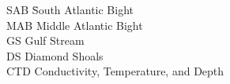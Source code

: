 
%
%
\begingroup
\newcommand{\Ab}[2]{\noindent  #1 \> #2 \\}
\newcommand{\Abi}[2]{\noindent #1 \hspace{1.5cm} \= #2 \\}
\begin{tabbing}
    \Abi{SAB}{South Atlantic Bight}

    \Ab{MAB}{Middle Atlantic Bight}
    \Ab{GS}{Gulf Stream}
    \Ab{DS}{Diamond Shoals}
    \Ab{CTD}{Conductivity, Temperature, and Depth}
\end{tabbing}
\endgroup
\clearpage
